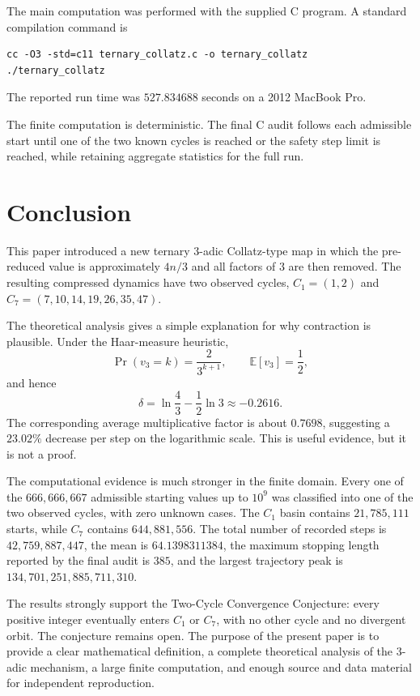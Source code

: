 \documentclass[11pt]{article}
\begin{document}
The main computation was performed with the supplied C program. A standard compilation command is
\begin{verbatim}
cc -O3 -std=c11 ternary_collatz.c -o ternary_collatz
./ternary_collatz
\end{verbatim}
The reported run time was $527.834688$ seconds on a 2012 MacBook Pro.

The finite computation is deterministic. The final C audit follows each admissible start until one of the two known cycles is reached or the safety step limit is reached, while retaining aggregate statistics for the full run.

\section{Conclusion}
This paper introduced a new ternary $3$-adic Collatz-type map in which the pre-reduced value is approximately $4n/3$ and all factors of $3$ are then removed. The resulting compressed dynamics have two observed cycles, $C_1=(1,2)$ and $C_7=(7,10,14,19,26,35,47)$.

The theoretical analysis gives a simple explanation for why contraction is plausible. Under the Haar-measure heuristic,
\[
\Pr(v_3=k)=\frac{2}{3^{k+1}},
\qquad
\mathbb E[v_3]=\frac12,
\]
and hence
\[
\delta=\ln\frac43-\frac12\ln3\approx-0.2616.
\]
The corresponding average multiplicative factor is about $0.7698$, suggesting a $23.02\%$ decrease per step on the logarithmic scale. This is useful evidence, but it is not a proof.

The computational evidence is much stronger in the finite domain. Every one of the $666,666,667$ admissible starting values up to $10^9$ was classified into one of the two observed cycles, with zero unknown cases. The $C_1$ basin contains $21,785,111$ starts, while $C_7$ contains $644,881,556$. The total number of recorded steps is $42,759,887,447$, the mean is $64.1398311384$, the maximum stopping length reported by the final audit is $385$, and the largest trajectory peak is $134,701,251,885,711,310$.

The results strongly support the Two-Cycle Convergence Conjecture: every positive integer eventually enters $C_1$ or $C_7$, with no other cycle and no divergent orbit. The conjecture remains open. The purpose of the present paper is to provide a clear mathematical definition, a complete theoretical analysis of the $3$-adic mechanism, a large finite computation, and enough source and data material for independent reproduction.
\end{document}
